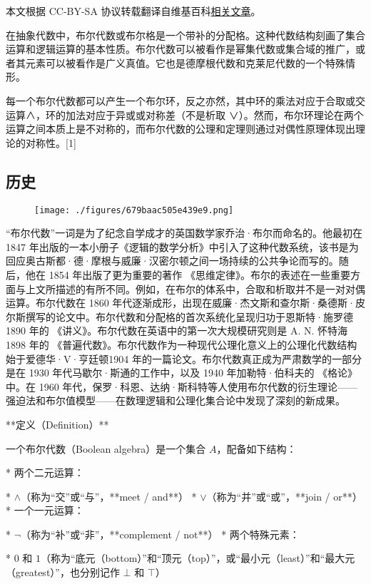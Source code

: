 
本文根据 CC-BY-SA 协议转载翻译自维基百科\href{https://en.wikipedia.org/wiki/Boolean_algebra_(structure)}{相关文章}。

在抽象代数中，布尔代数或布尔格是一个带补的分配格。这种代数结构刻画了集合运算和逻辑运算的基本性质。布尔代数可以被看作是幂集代数或集合域的推广，或者其元素可以被看作是广义真值。它也是德摩根代数和克莱尼代数的一个特殊情形。

每一个布尔代数都可以产生一个布尔环，反之亦然，其中环的乘法对应于合取或交运算∧，环的加法对应于异或或对称差（不是析取 ∨）。然而，布尔环理论在两个运算之间本质上是不对称的，而布尔代数的公理和定理则通过对偶性原理体现出理论的对称性。[1]
\subsection{历史}
\begin{figure}[ht]
\centering
\texttt{[image: ./figures/679baac505e439e9.png]}
\caption{} \label{fig_BRds_1}
\end{figure}
“布尔代数”一词是为了纪念自学成才的英国数学家乔治·布尔而命名的。他最初在 1847 年出版的一本小册子《逻辑的数学分析》中引入了这种代数系统，该书是为回应奥古斯都·德·摩根与威廉·汉密尔顿之间一场持续的公共争论而写的。随后，他在 1854 年出版了更为重要的著作 《思维定律》。布尔的表述在一些重要方面与上文所描述的有所不同。例如，在布尔的体系中，合取和析取并不是一对对偶运算。布尔代数在 1860 年代逐渐成形，出现在威廉·杰文斯和查尔斯·桑德斯·皮尔斯撰写的论文中。布尔代数和分配格的首次系统化呈现归功于恩斯特·施罗德1890 年的 《讲义》。布尔代数在英语中的第一次大规模研究则是 A. N. 怀特海1898 年的 《普遍代数》。布尔代数作为一种现代公理化意义上的公理化代数结构始于爱德华·V·亨廷顿1904 年的一篇论文。布尔代数真正成为严肃数学的一部分是在 1930 年代马歇尔·斯通的工作中，以及 1940 年加勒特·伯科夫的 《格论》 中。在 1960 年代，保罗·科恩、达纳·斯科特等人使用布尔代数的衍生理论——强迫法和布尔值模型——在数理逻辑和公理化集合论中发现了深刻的新成果。


**定义（Definition）**

一个\*\*布尔代数（Boolean algebra）\*\*是一个集合 $A$，配备如下结构：

* 两个二元运算：

  * $\land$（称为“交”或“与”，**meet / and**）
  * $\lor$（称为“并”或“或”，**join / or**）
* 一个一元运算：

  * $\lnot$（称为“补”或“非”，**complement / not**）
* 两个特殊元素：

  * $0$ 和 $1$（称为“底元（bottom）”和“顶元（top）”，或“最小元（least）”和“最大元（greatest）”，也分别记作 $\bot$ 和 $\top$）

